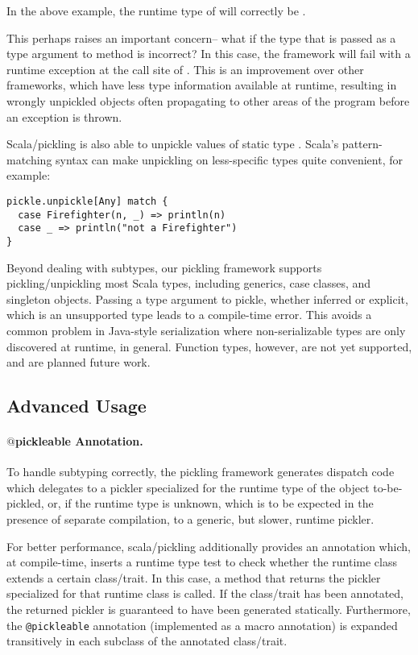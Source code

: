 In the above example, the runtime type of  will correctly be
.

This perhaps raises an important concern-- what if the type that is passed as
a type argument to method  is incorrect? In this case, the
framework will fail with a runtime exception at the call site of
. This is an improvement over other frameworks, which have less
type information available at runtime, resulting in wrongly unpickled objects
often propagating to other areas of the program before an exception is thrown.

Scala/pickling is also able to unpickle values of static type
. Scala's pattern-matching syntax can make unpickling on less-specific
types quite convenient, for example:

\begin{lstlisting}
pickle.unpickle[Any] match {
  case Firefighter(n, _) => println(n)
  case _ => println("not a Firefighter")
}
\end{lstlisting}

Beyond dealing with subtypes, our pickling framework supports
pickling/unpickling most Scala types, including generics, case classes, and
singleton objects. Passing a type argument to pickle, whether inferred or
explicit, which is an unsupported type leads to a compile-time error. This
avoids a common problem in Java-style serialization where non-serializable
types are only discovered at runtime, in general. Function types, however, are
not yet supported, and are planned future work.

\subsection{Advanced Usage}
\label{sec:pickleable-annotation}

\paragraph{$@$pickleable Annotation.} To handle subtyping correctly, the
pickling framework generates dispatch code which delegates to a pickler
specialized for the runtime type of the object to-be-pickled, or, if the
runtime type is unknown, which is to be expected in the presence of separate
compilation, to a generic, but slower, runtime pickler.

For better performance, scala/pickling additionally provides an
annotation which, at compile-time, inserts a runtime type test to check whether
the runtime class extends a certain class/trait. In this case, a
method that returns the pickler specialized for that runtime class is called. If the
class/trait has been annotated, the returned pickler is guaranteed to have been generated
statically. Furthermore, the \verb|@pickleable| annotation (implemented as a macro annotation)
is expanded transitively in each subclass of the annotated class/trait.

